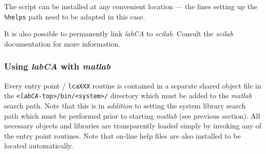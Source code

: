 \documentclass{article}
\newcommand{\sca}{\ita{labCA}}
\newcommand{\scilab}{\ita{scilab}}
\newcommand{\matlab}{\ita{matlab}}
\newcommand{\com}[1]{{\tt #1}}
\newcommand{\ita}[1]{\emph{#1}}
\begin{document}
The script can be installed at any convenient location --- the lines
setting up the \com{\%helps} path need to be adapted in this case.

It is also possible to permanently link \sca{} to \scilab{}. Consult
the \scilab{} documentation for more information.

\subsubsection{Using \sca{} with \matlab}
Every entry point / \com{lcaXXX} routine is contained in a separate
shared object file in the \com{<\sca-top>/bin/<system>/} directory
which must be added to the \matlab{} search path.
Note that this is in \ita{addition}
to setting the system library search path which must be performed prior
to starting \matlab{} (see previous section).
All necessary objects and libraries are transparently loaded simply
by invoking any of the entry point routines. Note that on-line help
files are also installed to be located automatically.
\end{document}
